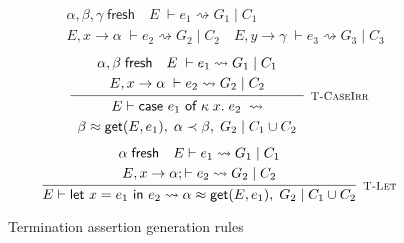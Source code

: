 \begin{figure}
\[{\begin{array}{c}
            \end{array}
        }{
            \begin{array}{c}
                \alpha, \beta, \gamma\; \textsf{fresh}
                \hspace{1em}
                E\; \vdash e_1 \rightsquigarrow G_1\; |\; C_1 \\[2.5pt]
                E, x \rightarrow \alpha\; \vdash e_2 \rightsquigarrow G_2\; |\; C_2
                \hspace{1em}
                E, y \rightarrow \gamma\; \vdash e_3 \rightsquigarrow G_3\; |\; C_3
            \end{array}
        }
    \]
    \vspace{10pt}
    \[
        \infer[\textsc{\footnotesize T-CaseIrr}]{
            \begin{array}{c}
                E \vdash \textsf{case } e_1 \textsf{ of } \kappa\; x.\; e_2\; 
                \rightsquigarrow \\[2.5pt]
                \beta \teq \textsf{get}(E, e_1),\; \alpha \tlt \beta,\; G_2\; |\; C_1 \cup C_2
            \end{array}
        }{
            \begin{array}{c}
                \alpha, \beta\; \textsf{fresh}
                \hspace{1em}
                E\; \vdash e_1 
                    \rightsquigarrow G_1\; |\; C_1 \\[2.5pt]
                E, x \rightarrow \alpha\; 
                    \vdash e_2 \rightsquigarrow G_2\; |\; C_2
            \end{array}
        }
    \]
    \vspace{10pt}
    \[
        \infer[\textsc{\footnotesize T-Let}]{
            E \vdash \textsf{let } x = e_1 \textsf{ in } e_2
                \rightsquigarrow  \alpha \teq \textsf{get}(E, e_1),\; G_2\; |\; C_1 \cup C_2
        }{
            \begin{array}{c}
                \alpha \; \textsf{fresh}
                \hspace{1em}
                E \vdash e_1 \rightsquigarrow G_1\; |\; C_1 \\[2.5pt]
                E, x \rightarrow \alpha; \vdash e_2 
                    \rightsquigarrow G_2\; |\; C_2
            \end{array}
        }
    \]
    \caption{Termination assertion generation rules}
    \label{fig:terminationassertiongen}
\end{figure}

